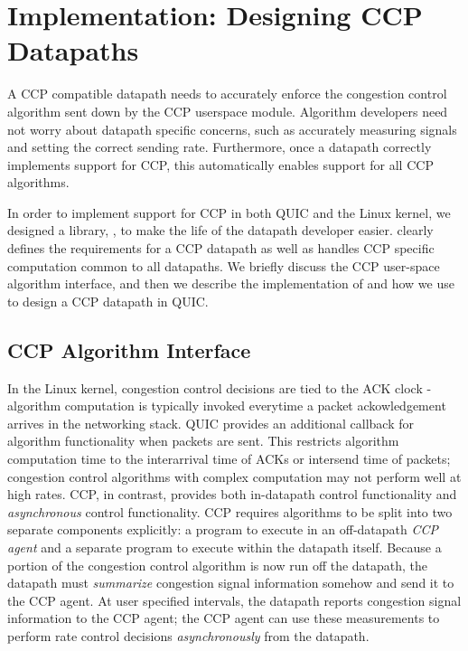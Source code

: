 \chapter{Implementation: Designing CCP Datapaths}
\label{sec:impl}
A CCP compatible datapath needs to accurately enforce the congestion control algorithm sent down by the CCP userspace module. Algorithm developers need not worry about datapath specific concerns, such as accurately measuring signals and setting the correct sending rate. Furthermore, once a datapath correctly implements support for CCP, this automatically enables support for all CCP algorithms.

In order to implement support for CCP in both QUIC and the Linux kernel, we designed a library, , to make the life of the datapath developer easier.  clearly defines the requirements for a CCP datapath as well as handles CCP specific computation common to all datapaths.
We briefly discuss the CCP user-space algorithm interface, and then we describe the implementation of  and how we use  to design a CCP datapath in QUIC.

\section{CCP Algorithm Interface}
\label{sec:impl:alg_interface}
In the Linux kernel, congestion control decisions are tied to the ACK clock - algorithm computation is typically invoked everytime a packet ackowledgement arrives in  the networking stack.
QUIC provides an additional callback for algorithm functionality when packets are sent.
This restricts algorithm computation time to the interarrival time of ACKs or intersend time of packets; congestion control algorithms with complex computation may not perform well at high rates.
CCP, in contrast, provides both in-datapath control functionality and \textit{asynchronous} control functionality.
CCP requires algorithms to be split into two separate components explicitly: a program to execute in an off-datapath \textit{CCP agent} and a separate program to execute within the datapath itself.
Because a portion of the congestion control algorithm is now run off the datapath, the datapath must \textit{summarize} congestion signal information somehow and send it to the CCP agent.
At user specified intervals, the datapath reports congestion signal information to the CCP agent; the CCP agent can use these measurements to perform rate control decisions \textit{asynchronously} from the datapath.

